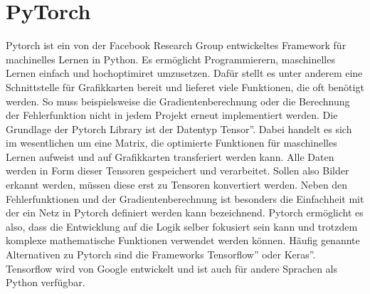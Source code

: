 \documentclass{article}
\begin{document}
\section{PyTorch}
Pytorch ist ein von der Facebook Research Group entwickeltes Framework für machinelles Lernen in Python. Es ermöglicht Programmierern, maschinelles Lernen einfach und hochoptimiret umzusetzen. Dafür stellt es unter anderem eine Schnittstelle für Grafikkarten bereit und lieferet viele Funktionen, die oft benötigt werden. So muss beispielsweise die Gradientenberechnung oder die Berechnung der Fehlerfunktion nicht in jedem Projekt erneut implementiert werden. Die Grundlage der Pytorch Library ist der Datentyp \glqq Tensor''. Dabei handelt es sich im wesentlichen um eine Matrix, die optimierte Funktionen für maschinelles Lernen aufweist und auf Grafikkarten transferiert werden kann. Alle Daten werden in Form dieser Tensoren gespeichert und verarbeitet. Sollen also Bilder erkannt werden, müssen diese erst zu Tensoren konvertiert werden. Neben den Fehlerfunktionen und der Gradientenberechnung ist besonders die Einfachheit mit der ein Netz in Pytorch definiert werden kann bezeichnend. Pytorch ermöglicht es also, dass die Entwicklung auf die Logik selber fokusiert sein kann und trotzdem komplexe mathematische Funktionen verwendet werden können. Häufig genannte Alternativen zu Pytorch sind die Frameworks \glqq Tensorflow'' oder \glqq Keras''. Tensorflow wird von Google entwickelt und ist auch für andere Sprachen als Python verfügbar.
\end{document}
